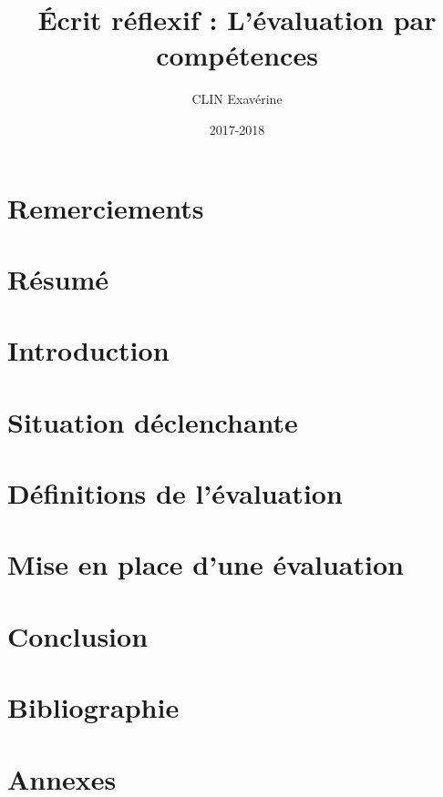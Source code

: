 \documentclass[a4paper, 12pt]{article}
\title{Écrit réflexif : L'évaluation par compétences}
\author{CLIN Exavérine}
\date{2017-2018}
\begin{document}
\maketitle
\thispagestyle{empty}

\newpage
\part*{Remerciements}

\thispagestyle{empty}

\newpage
\part*{Résumé}



\newpage
\tableofcontents

\newpage
\part{Introduction}


\newpage
\part{Situation déclenchante}

\setcounter{section}{0}

\newpage
\part{Définitions de l'évaluation}

\setcounter{section}{0}

\newpage
\part{Mise en place d'une évaluation}

\setcounter{section}{0}

%

\newpage
\part{Conclusion}


\newpage
\part*{Bibliographie}


\newpage
\part*{Annexes}

\end{document}
